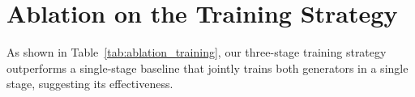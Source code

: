 \documentclass[sigconf, nonacm]{acmart}
\begin{document}
\begin{table}[H]
\centering
\caption{User study results. For each aspect, the percentage of the time that each method is chosen as the best is reported.}
\label{tab:user_study_supp}
\end{table}

\section{Ablation on the Training Strategy}

As shown in Table~\ref{tab:ablation_training}, our three-stage training strategy outperforms a single-stage baseline that jointly trains both generators in a single stage, suggesting its effectiveness.

\begin{table}[H]
\centering
\caption{Ablation on our training strategy. 
The best results are in bold.}
\label{tab:ablation_training}
\end{table}
\end{document}
